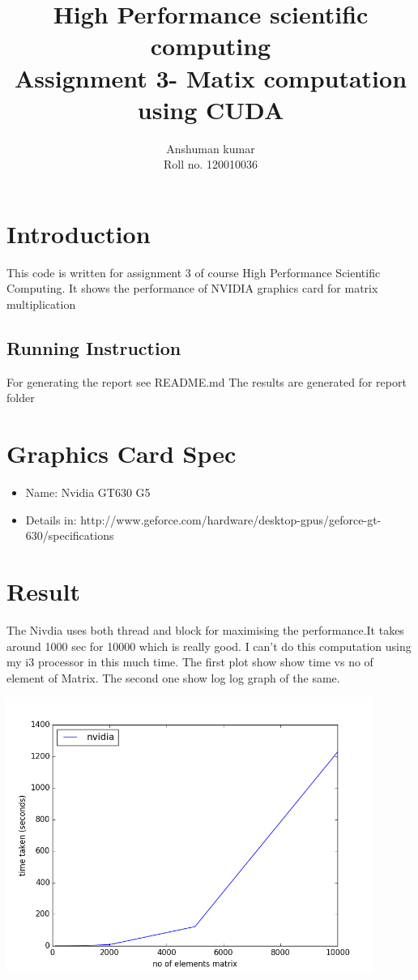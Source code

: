 \documentclass[12pt]{article}
\title {High Performance scientific computing \\
Assignment 3- Matix computation using CUDA }
\author {Anshuman kumar \\
Roll no.  120010036}
\begin{document}
\maketitle
\section{Introduction}
This code is written for assignment 3 of course High Performance Scientific
Computing. It shows the performance of NVIDIA graphics card for matrix multiplication

\subsection{Running Instruction}
For generating the report see README.md
The results are generated for report folder

\section{Graphics Card Spec}
\begin{itemize}
    \item Name: Nvidia GT630 G5
    \item Details in: http://www.geforce.com/hardware/desktop-gpus/geforce-gt-630/specifications
\end{itemize}


\section{Result}
The Nivdia uses both thread and block for maximising the performance.It takes around
1000 sec for 10000 which is really good. I can't do this computation using my i3 processor in this much time. The first plot show show time vs no of element of Matrix.
The second one show log log graph of the same.

\includegraphics[width=12cm]{normal}
\end{document}
